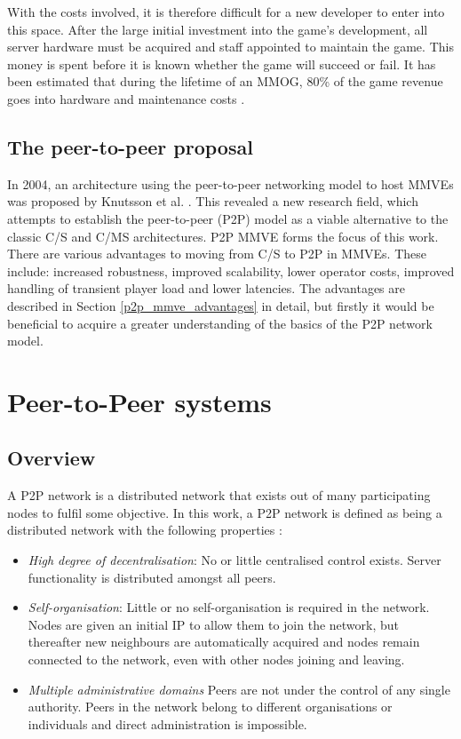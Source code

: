 With the costs involved, it is therefore difficult for a new developer to enter into this space. After the large initial investment into the game's development, all server hardware must be acquired and staff appointed to maintain the game. This money is spent before it is known whether the game will succeed or fail. It has been estimated that during the lifetime of an MMOG, 80\% of the game revenue goes into hardware and maintenance costs \cite{cs_mmog_cost}.

\subsection{The peer-to-peer proposal}

In 2004, an architecture using the peer-to-peer networking model to host MMVEs was proposed by Knutsson et al. \cite{knutsson_p2p_first}. This
revealed a new research field, which attempts to establish the peer-to-peer (P2P) model as a viable alternative to the classic C/S and C/MS
architectures. P2P MMVE forms the focus of this work. There are various advantages to moving from C/S to P2P in MMVEs. These include: increased robustness, improved scalability, lower operator costs, improved handling of transient player load and lower latencies. The advantages are described in Section \ref{p2p_mmve_advantages} in detail,
but firstly it would be beneficial to acquire a greater understanding of the basics of the P2P network model.

\section{Peer-to-Peer systems}

\subsection{Overview}

A P2P network is a distributed network that exists out of many participating nodes to fulfil some objective. In this work, a P2P network is defined as being a distributed network with the following properties
\cite{Rodrigues_acm_comms_p2p}:
%
\begin{itemize}
\item \emph{High degree of decentralisation}:  No or little centralised control exists. Server functionality is distributed amongst all peers.
\item \emph{Self-organisation}: Little or no self-organisation is required in the network. Nodes are given an initial IP to allow them to join the network, but thereafter new neighbours are automatically acquired and nodes remain connected to the network, even with other nodes joining and leaving.
\item \emph{Multiple administrative domains} Peers are not under the control of any single authority. Peers in the network belong to different organisations or individuals and direct administration is impossible.
\end{itemize}


